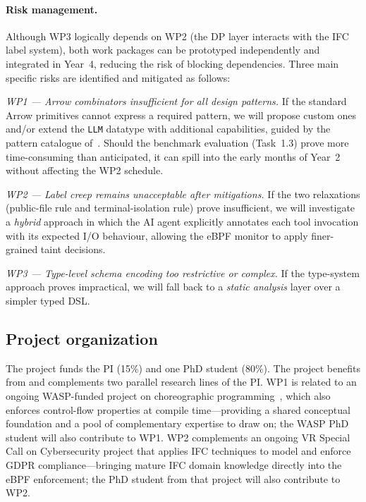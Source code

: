 \documentclass{kaw}
\begin{document}
\paragraph{Risk management.}
Although WP3 logically depends on WP2 (the DP layer interacts with the IFC
label system), both work packages can be prototyped independently and
integrated in Year~4, reducing the risk of blocking dependencies.
%
Three main specific risks are identified and mitigated as follows:

\begin{CompactItemizeee} \item \emph{WP1 --- Arrow combinators insufficient for
  all design patterns.} If the standard Arrow primitives cannot express a
  required pattern, we will propose custom ones and/or extend the \texttt{LLM}
  datatype with additional capabilities, guided by the pattern catalogue
  of~\cite{BeurerKellner:Patterns25}.
  Should the benchmark evaluation (Task~1.3) prove more time-consuming than
  anticipated, it can spill into the early months of Year~2 without affecting
  the WP2 schedule.
%
  \item \emph{WP2 --- Label creep remains unacceptable after mitigations.}
    If the two relaxations (public-file rule and terminal-isolation rule)
    prove insufficient, we will investigate a \emph{hybrid} approach in
    which the AI agent explicitly annotates each tool invocation with its
    expected I/O behaviour, allowing the eBPF monitor to apply finer-grained
    taint decisions.
%
  \item \emph{WP3 --- Type-level schema encoding too restrictive or complex.}
    If the type-system approach proves impractical, we will fall back to a
    \emph{static analysis} layer over a simpler typed DSL. 
  \end{CompactItemizeee}


\subsection{Project organization}

The project funds the PI (15\%) and one PhD student (80\%). 
%
%
The project benefits from and
complements two parallel research lines of the PI. 
%
WP1 is related to an ongoing WASP-funded project on choreographic
programming~\cite{Ionescu:Russo:PEPM26}, which also enforces control-flow
properties at compile time---providing a shared conceptual foundation and a
pool of complementary expertise to draw on; the WASP PhD student will
also contribute to WP1.
%
WP2 complements an ongoing VR Special Call on Cybersecurity project that
applies IFC techniques to model and enforce GDPR compliance---bringing mature
IFC domain knowledge directly into the eBPF enforcement; the PhD
student from that project will also contribute to WP2.
\end{document}
